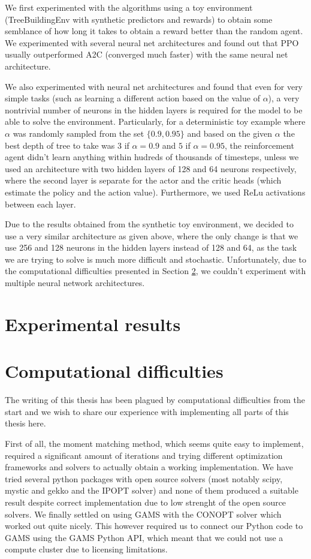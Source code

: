 We first experimented with the algorithms using a toy environment (TreeBuildingEnv with synthetic predictors and rewards) to obtain some semblance of how long it takes to obtain a reward better than the random agent. We experimented with several neural net architectures and found out that PPO usually outperformed A2C (converged much faster) with the same neural net architecture. 

We also experimented with neural net architectures and found that even for very simple tasks (such as learning a different action based on the value of $\alpha$), a very nontrivial number of neurons in the hidden layers is required for the model to be able to solve the environment. Particularly, for a deterministic toy example where $\alpha$ was randomly sampled from the set $\{0.9, 0.95\}$ and based on the given $\alpha$ the best depth of tree to take was $3$ if $\alpha=0.9$ and $5$ if $\alpha=0.95$, the reinforcement agent didn't learn anything within hudreds of thousands of timesteps, unless we used an architecture with two hidden layers of 128 and 64 neurons respectively, where the second layer is separate for the actor and the critic heads (which estimate the policy and the action value). Furthermore, we used ReLu activations between each layer. 

Due to the results obtained from the synthetic toy environment, we decided to use a very similar architecture as given above, where the only change is that we use 256 and 128 neurons in the hidden layers instead of 128 and 64, as the task we are trying to solve is much more difficult and stochastic. Unfortunately, due to the computational difficulties presented in Section \ref{section:computational_difficulties}, we couldn't experiment with multiple neural network architectures.

\section{Experimental results}
\label{section:experimental_results}

\section{Computational difficulties}
\label{section:computational_difficulties}
The writing of this thesis has been plagued by computational difficulties from the start and we wish to share our experience with implementing all parts of this thesis here. 

First of all, the moment matching method, which seems quite easy to implement, required a significant amount of iterations and trying different optimization frameworks and solvers to actually obtain a working implementation. We have tried several python packages with open source solvers (most notably scipy, mystic and gekko  and the IPOPT solver) and none of them produced a suitable result despite correct implementation due to low strenght of the open source solvers. We finally settled on using GAMS with the CONOPT solver  which worked out quite nicely. This however required us to connect our Python code to GAMS using the GAMS Python API, which meant that we could not use a compute cluster due to licensing limitations. 

